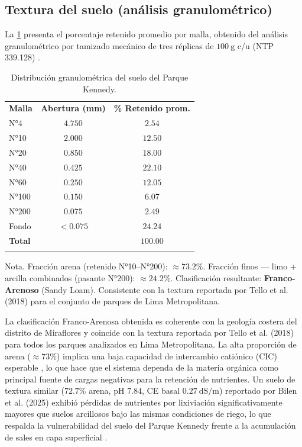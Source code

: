 \documentclass[fleqn]{jaes}
\begin{document}
\subsection{Textura del suelo (análisis granulométrico)}

La \cref{tab:textura} presenta el porcentaje retenido promedio por malla, obtenido del análisis granulométrico por tamizado mecánico de tres réplicas de $100~\text{g}$ c/u (NTP 339.128) \cite{INACAL1999}.

\begin{table}[htbp]
\centering
\small
\caption{Distribución granulométrica del suelo del Parque Kennedy.}\label{tab:textura}
\begin{tabular}{@{}lcc@{}}
\toprule
\textbf{Malla} & \textbf{Abertura (mm)} & \textbf{\% Retenido prom.} \\
\colrule
N°4   & $4.750$ & $2.54$ \\
N°10  & $2.000$ & $12.50$ \\
N°20  & $0.850$ & $18.00$ \\
N°40  & $0.425$ & $22.10$ \\
N°60  & $0.250$ & $12.05$ \\
N°100 & $0.150$ & $6.07$ \\
N°200 & $0.075$ & $2.49$ \\
Fondo & ${<}0.075$ & $24.24$ \\
\colrule
\textbf{Total} & & $\mathbf{100.00}$ \\
\botrule
\end{tabular}
\begin{tabnote}
Nota. Fracción arena (retenido N°10--N°200): $\approx 73.2\%$. Fracción finos — limo + arcilla combinados (pasante N°200): $\approx 24.2\%$. Clasificación resultante: \textbf{Franco-Arenoso} (Sandy Loam). Consistente con la textura reportada por Tello et al. (2018) para el conjunto de parques de Lima Metropolitana.
\end{tabnote}
\end{table}

La clasificación Franco-Arenosa obtenida es coherente con la geología costera del distrito de Miraflores y coincide con la textura reportada por Tello et al. (2018) para todos los parques analizados en Lima Metropolitana. La alta proporción de arena ($\approx 73\%$) implica una baja capacidad de intercambio catiónico (CIC) esperable \cite{Bilen2025}, lo que hace que el sistema dependa de la materia orgánica como principal fuente de cargas negativas para la retención de nutrientes. Un suelo de textura similar ($72.7\%$ arena, pH $7.84$, CE basal $0.27~\text{dS/m}$) reportado por Bilen et al. (2025) exhibió pérdidas de nutrientes por lixiviación significativamente mayores que suelos arcillosos bajo las mismas condiciones de riego, lo que respalda la vulnerabilidad del suelo del Parque Kennedy frente a la acumulación de sales en capa superficial \cite{Bilen2025}.
\end{document}
